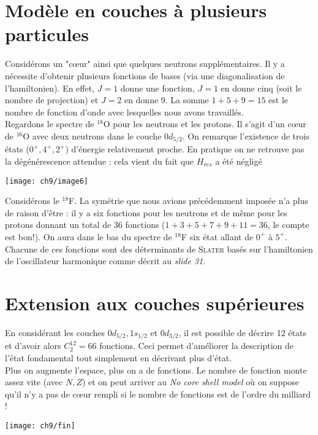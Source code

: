 \section{Modèle en couches à plusieurs particules}
Considérons un "cœur" ainsi que quelques neutrons supplémentaires. Il y a nécessite d'obtenir plusieurs fonctions
de bases (via une diagonalisation de l'hamiltonien). En effet, $J=1$ donne une fonction, $J=1$ en donne cinq 
(soit le nombre de projection) et $J=2$ en donne 9. La somme $1+5+9=15$ est le nombre de fonction d'onde avec 
lesquelles nous avons travaillés. \\

Regardons le spectre de $^{18}$O pour les neutrons et les protons. Il s'agit d'un cœur de $^{16}$O avec deux
neutrons dans le couche $0d_{5/2}$. On remarque l'existence de trois états ($0^+, 4^+, 2^+$) d'énergie 
relativement proche. En pratique on ne retrouve pas la dégénérescence attendue : cela vient du fait que
$H_{res}$ a été négligé


	\begin{center}
	\texttt{[image: ch9/image6]}
	\end{center}

Considérons le $^{18}$F. La symétrie que nous avions précédemment imposée n'a plus de raison d'être : il y a
six fonctions pour les neutrons et de même pour les protons donnant un total de 36 fonctions ($1+3+5+7+9+11=
36$, le compte est bon!). On aura dans le bas du spectre de $^{18}$F six état allant de $0^+$ à $5^+$. Chacune
de ces fonctions sont des déterminants de \textsc{Slater} basés sur l'hamiltonien de l’oscillateur harmonique
comme décrit au \textit{slide 31}.



\section{Extension aux couches supérieures}
En considérant les couches $0d_{5/2}, 1s_{1/2}$ et $0d_{3/2}$, il est possible de décrire 12 états et d'avoir
alors $C^{12}_2=66$ fonctions. Ceci permet d'améliorer la description de l'état fondamental tout simplement
en décrivant plus d'état. \\

Plus on augmente l'espace, plus on a de fonctions. Le nombre de fonction monte assez vite (avec $N, Z$) et on 
peut arriver au \textit{No core shell model} où on suppose qu'il n'y a pas de cœur rempli si le nombre 
de fonctions est de l'ordre du milliard !

\vspace{4cm}
\begin{center}
\texttt{[image: ch9/fin]}
\end{center}